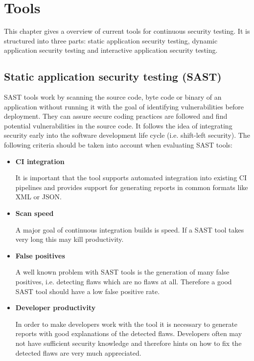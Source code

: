 \documentclass[conference]{IEEEtran}
\begin{document}
\newpage

\section{Tools}

This chapter gives a overview of current tools for continuous security testing. It is structured into three parts: static application security testing, dynamic application security testing and interactive application security testing.

\subsection{Static application security testing (SAST)}

SAST tools work by scanning the source code, byte code or binary of an application without running it with the goal of identifying vulnerabilities before deployment. They can assure secure coding practices are followed and find potential vulnerabilities in the source code. It follows the idea of integrating security early into the software development life cycle (i.e. shift-left security). The following criteria should be taken into account when evaluating SAST tools: \\

\begin{itemize}
	\item \textbf{CI integration}
	
	It is important that the tool supports automated integration into existing CI pipelines and provides support for generating reports in common formats like XML or JSON.
	
	\item \textbf{Scan speed}
	
	A major goal of continuous integration builds is speed. If a SAST tool takes very long this may kill productivity.
	
	\item \textbf{False positives}
	
	A well known problem with SAST tools is the generation of many false positives, i.e. detecting flaws which are no flaws at all. Therefore a good SAST tool should have a low false positive rate.
	
	\item \textbf{Developer productivity}
	
	In order to make developers work with the tool it is necessary to generate reports with good explanations of the detected flaws. Developers often may not have sufficient security knowledge and therefore hints on how to fix the detected flaws are very much appreciated.\\
\end{itemize}
\end{document}
